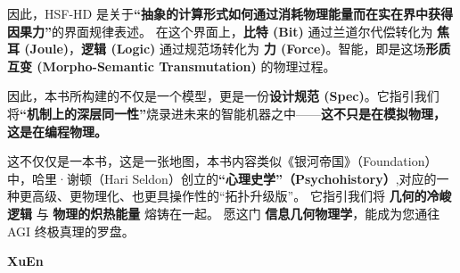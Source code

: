 \begin{enumerate}
    因此，HSF-HD 是关于\textbf{“抽象的计算形式如何通过消耗物理能量而在实在界中获得因果力”}的界面规律表述。
    在这个界面上，\textbf{比特 (Bit)} 通过兰道尔代偿转化为 \textbf{焦耳 (Joule)}，\textbf{逻辑 (Logic)} 通过规范场转化为 \textbf{力 (Force)}。智能，即是这场\textbf{形质互变 (Morpho-Semantic Transmutation)} 的物理过程。
\end{enumerate}

因此，本书所构建的不仅是一个模型，更是一份\textbf{设计规范 (Spec)}。它指引我们将\textbf{“机制上的深层同一性”}烧录进未来的智能机器之中——\textbf{这不只是在模拟物理，这是在编程物理。}

\vspace{2em}

这不仅仅是一本书，这是一张地图，本书内容类似《银河帝国》（Foundation）中，哈里·谢顿（Hari Seldon）创立的\textbf{“心理史学”（Psychohistory）},对应的一种更高级、更物理化、也更具操作性的“拓扑升级版”。
它指引我们将 \textbf{几何的冷峻逻辑} 与 \textbf{物理的炽热能量} 熔铸在一起。
愿这门 \textbf{信息几何物理学}，能成为您通往 AGI 终极真理的罗盘。

\vspace{2em}

\hfill \textbf{XuEn}
